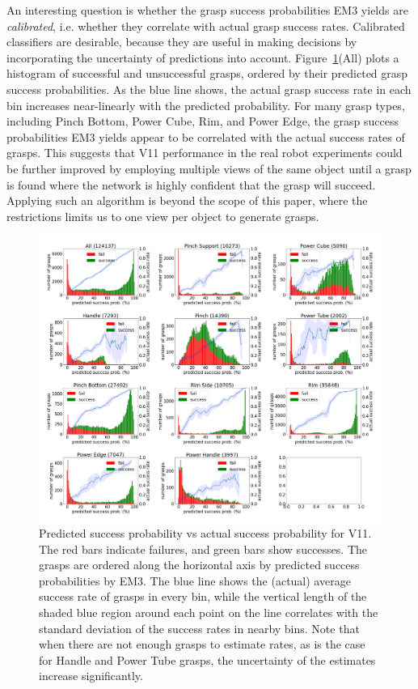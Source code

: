 An interesting question is whether the grasp success probabilities EM3 yields are \textit{calibrated}, i.e. whether they correlate with actual grasp success rates. Calibrated classifiers are desirable, because they are useful in making decisions by incorporating the uncertainty of predictions into account. Figure~\ref{fig:calibrate}(All) plots a histogram of successful and unsuccessful grasps, ordered by their predicted grasp success probabilities. As the blue line shows, the actual grasp success rate in each bin increases near-linearly with the predicted probability. For many grasp types, including Pinch Bottom, Power Cube, Rim, and Power Edge, the grasp success probabilities EM3 yields appear to be correlated with the actual success rates of grasps. This suggests that V11 performance in the real robot experiments could be further improved by employing multiple views of the same object until a grasp is found where the network is highly confident that the grasp will succeed. Applying such an algorithm is beyond the scope of this paper, where the restrictions limits us to one view per object to generate grasps.

\begin{figure}
\centering
\includegraphics[width=1.02\columnwidth]{images/post-analysis/V11_pred_success_vs_success.png}
\caption{Predicted success probability vs actual success probability for V11. The red bars indicate failures, and green bars show successes. The grasps are ordered along the horizontal axis by predicted success probabilities by EM3. The blue line shows the (actual) average success rate of grasps in every bin, while the vertical length of the shaded blue region around each point on the line correlates with the standard deviation of the success rates in nearby bins. Note that when there are not enough grasps to estimate rates, as is the case for Handle and Power Tube grasps, the uncertainty of the estimates increase significantly.}
\label{fig:calibrate}
\end{figure}

